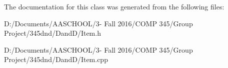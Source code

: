 The documentation for this class was generated from the following files\+:\begin{DoxyCompactItemize}
\item 
D\+:/\+Documents/\+A\+A\+S\+C\+H\+O\+O\+L/3-\/ Fall 2016/\+C\+O\+M\+P 345/\+Group Project/345dnd/\+Dand\+D/Item.\+h\item 
D\+:/\+Documents/\+A\+A\+S\+C\+H\+O\+O\+L/3-\/ Fall 2016/\+C\+O\+M\+P 345/\+Group Project/345dnd/\+Dand\+D/Item.\+cpp\end{DoxyCompactItemize}

